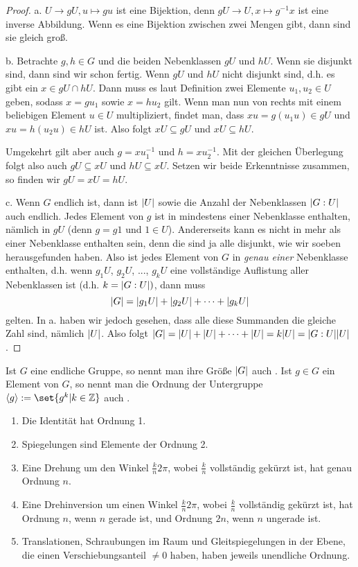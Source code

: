 \begin{proof}
a. $U\to gU, u\mapsto gu$ ist eine Bijektion, denn $gU\to U, x\mapsto g^{-1} x$ ist eine inverse Abbildung. Wenn es eine Bijektion zwischen zwei Mengen gibt, dann sind sie gleich groß.

\medbreak
b. Betrachte $g,h\in G$ und die beiden Nebenklassen $gU$ und $hU$. Wenn sie disjunkt sind, dann sind wir schon fertig. Wenn $gU$ und $hU$ nicht disjunkt sind, d.h. es gibt ein $x\in gU\cap hU$. Dann muss es laut Definition zwei Elemente $u_1,u_2\in U$ geben, sodass $x=gu_1$ sowie $x=hu_2$ gilt. Wenn man nun von rechts mit einem beliebigen Element $u\in U$ multipliziert, findet man, dass $xu = g(u_1 u)\in gU$ und $xu=h(u_2 u)\in hU$ ist. Also folgt $xU\subseteq gU$ und $xU\subseteq hU$.

Umgekehrt gilt aber auch $g=xu_1^{-1}$ und $h=xu_2^{-1}$. Mit der gleichen Überlegung folgt also auch $gU\subseteq xU$ und $hU\subseteq xU$. Setzen wir beide Erkenntnisse zusammen, so finden wir $gU=xU=hU$.

\medbreak
c. Wenn $G$ endlich ist, dann ist $\lvert U\rvert$ sowie die Anzahl der Nebenklassen $\lvert G:U\rvert$ auch endlich. Jedes Element von $g$ ist in mindestens einer Nebenklasse enthalten, nämlich in $gU$ (denn $g=g1$ und $1\in U$). Andererseits kann es nicht in mehr als einer Nebenklasse enthalten sein, denn die sind ja alle disjunkt, wie wir soeben herausgefunden haben. Also ist jedes Element von $G$ in \emph{genau einer} Nebenklasse enthalten, d.h. wenn $g_1 U$, $g_2 U$, ..., $g_k U$ eine vollständige Auflistung aller Nebenklassen ist (d.h. $k=\lvert G:U\rvert)$, dann muss
\[\lvert G\rvert = \lvert g_1 U\rvert + \lvert g_2 U\rvert + \cdots + \lvert g_k U\rvert\]
gelten. In a. haben wir jedoch gesehen, dass alle diese Summanden die gleiche Zahl sind, nämlich $\lvert U\rvert$. Also folgt $\lvert G\rvert=\lvert U\rvert+\lvert U\rvert+\cdots+\lvert U\rvert = k\lvert U\rvert = \lvert G:U\rvert\lvert U\rvert$.
\end{proof}

\begin{definition}
Ist $G$ eine endliche Gruppe, so nennt man ihre Größe $\lvert G\rvert$ auch . Ist $g\in G$ ein Element von $G$, so nennt man die Ordnung der Untergruppe $\langle g\rangle:=\set{g^k | k\in\IZ}$ auch .
\end{definition}

\begin{example}
\begin{enumerate}
\item Die Identität hat Ordnung 1.
\item Spiegelungen sind Elemente der Ordnung 2.
\item Eine Drehung um den Winkel $\frac{k}{n}2\pi$, wobei $\frac{k}{n}$ vollständig gekürzt ist, hat genau Ordnung $n$.
\item Eine Drehinversion um einen Winkel $\frac{k}{n}2\pi$, wobei $\frac{k}{n}$ vollständig gekürzt ist, hat Ordnung $n$, wenn $n$ gerade ist, und Ordnung $2n$, wenn $n$ ungerade ist.
\item Translationen, Schraubungen im Raum und Gleitspiegelungen in der Ebene, die einen Verschiebungsanteil $\neq 0$ haben, haben jeweils unendliche Ordnung.
\end{enumerate}
\end{example}

